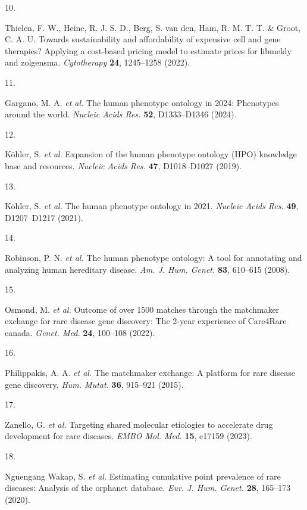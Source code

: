 \documentclass[
sn-nature
]{sn-jnl}
\newlength{\cslhangindent}
\newlength{\csllabelwidth}
\newenvironment{CSLReferences}[2] %
 {\begin{list}{}{%
  \setlength{\itemindent}{0pt}
  \setlength{\leftmargin}{0pt}
  \setlength{\parsep}{0pt}
  \ifodd #1
   \setlength{\leftmargin}{\cslhangindent}
   \setlength{\itemindent}{-1\cslhangindent}
  \fi
  \setlength{\itemsep}{#2\baselineskip}}}
 {\end{list}}
\newcommand{\CSLLeftMargin}[1]{\parbox[t]{\csllabelwidth}{\strut#1\strut}}
\newcommand{\CSLRightInline}[1]{\parbox[t]{\linewidth - \csllabelwidth}{\strut#1\strut}}
\begin{document}
\begin{CSLReferences}{0}{0}
\CSLLeftMargin{10. }%
\CSLRightInline{Thielen, F. W., Heine, R. J. S. D., Berg, S. van den,
Ham, R. M. T. T. \& Groot, C. A. U. Towards sustainability and
affordability of expensive cell and gene therapies? Applying a
cost-based pricing model to estimate prices for libmeldy and zolgensma.
\emph{Cytotherapy} \textbf{24}, 1245--1258 (2022).}

\CSLLeftMargin{11. }%
\CSLRightInline{Gargano, M. A. \emph{et al.} The human phenotype
ontology in 2024: Phenotypes around the world. \emph{Nucleic Acids Res.}
\textbf{52}, D1333--D1346 (2024).}

\CSLLeftMargin{12. }%
\CSLRightInline{Köhler, S. \emph{et al.} Expansion of the human
phenotype ontology ({HPO}) knowledge base and resources. \emph{Nucleic
Acids Res.} \textbf{47}, D1018--D1027 (2019).}

\CSLLeftMargin{13. }%
\CSLRightInline{Köhler, S. \emph{et al.} The human phenotype ontology in
2021. \emph{Nucleic Acids Res.} \textbf{49}, D1207--D1217 (2021).}

\CSLLeftMargin{14. }%
\CSLRightInline{Robinson, P. N. \emph{et al.} The human phenotype
ontology: A tool for annotating and analyzing human hereditary disease.
\emph{Am. J. Hum. Genet.} \textbf{83}, 610--615 (2008).}

\CSLLeftMargin{15. }%
\CSLRightInline{Osmond, M. \emph{et al.} Outcome of over 1500 matches
through the matchmaker exchange for rare disease gene discovery: The
2-year experience of {Care4Rare} canada. \emph{Genet. Med.} \textbf{24},
100--108 (2022).}

\CSLLeftMargin{16. }%
\CSLRightInline{Philippakis, A. A. \emph{et al.} The matchmaker
exchange: A platform for rare disease gene discovery. \emph{Hum. Mutat.}
\textbf{36}, 915--921 (2015).}

\CSLLeftMargin{17. }%
\CSLRightInline{Zanello, G. \emph{et al.} Targeting shared molecular
etiologies to accelerate drug development for rare diseases. \emph{EMBO
Mol. Med.} \textbf{15}, e17159 (2023).}

\CSLLeftMargin{18. }%
\CSLRightInline{Nguengang Wakap, S. \emph{et al.} Estimating cumulative
point prevalence of rare diseases: Analysis of the orphanet database.
\emph{Eur. J. Hum. Genet.} \textbf{28}, 165--173 (2020).}


\end{CSLReferences}
\end{document}
